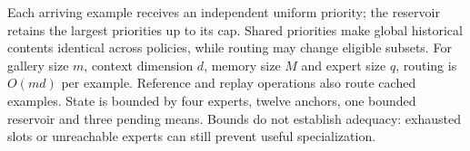 Each arriving example receives an independent uniform priority; the reservoir retains the largest priorities up to its cap. Shared priorities make global historical contents identical across policies, while routing may change eligible subsets. For gallery size \(m\), context dimension \(d\), memory size \(M\) and expert size \(q\), routing is \(O(md)\) per example. Reference and replay operations also route cached examples. State is bounded by four experts, twelve anchors, one bounded reservoir and three pending means. Bounds do not establish adequacy: exhausted slots or unreachable experts can still prevent useful specialization.

